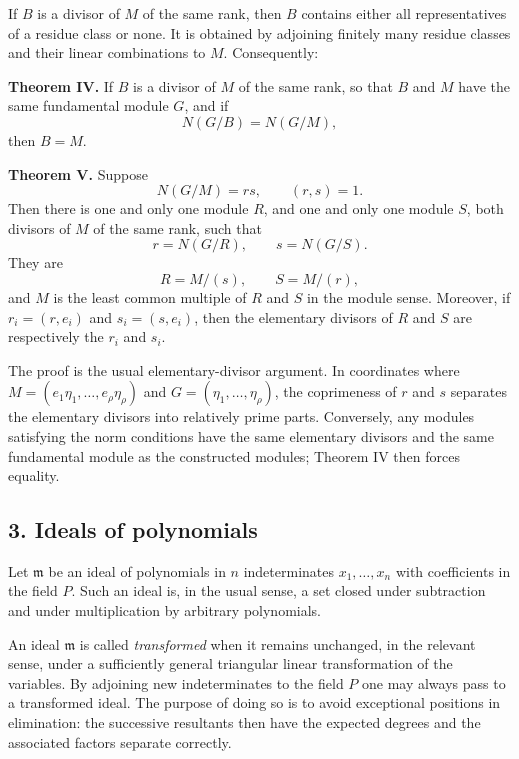 \documentclass[11pt]{article}
\begin{document}
If $B$ is a divisor of $M$ of the same rank, then $B$ contains either all representatives of a residue class or none. It is obtained by adjoining finitely many residue classes and their linear combinations to $M$. Consequently:

\textbf{Theorem IV.} If $B$ is a divisor of $M$ of the same rank, so that $B$ and $M$ have the same fundamental module $G$, and if
\[
  N(G/B)=N(G/M),
\]
then $B=M$.

\textbf{Theorem V.} Suppose
\begin{equation}
  N(G/M)=rs,\qquad (r,s)=1.                                      \tag{10}
\end{equation}
Then there is one and only one module $R$, and one and only one module $S$, both divisors of $M$ of the same rank, such that
\[
  r=N(G/R),\qquad s=N(G/S).
\]
They are
\begin{equation}
  R=M/(s),
  \qquad S=M/(r),                                                  \tag{11}
\end{equation}
and $M$ is the least common multiple of $R$ and $S$ in the module sense. Moreover, if $r_i=(r,e_i)$ and $s_i=(s,e_i)$, then the elementary divisors of $R$ and $S$ are respectively the $r_i$ and $s_i$.

The proof is the usual elementary-divisor argument. In coordinates where $M=(e_1\eta_1,\ldots,e_\rho\eta_\rho)$ and $G=(\eta_1,\ldots,\eta_\rho)$, the coprimeness of $r$ and $s$ separates the elementary divisors into relatively prime parts. Conversely, any modules satisfying the norm conditions have the same elementary divisors and the same fundamental module as the constructed modules; Theorem IV then forces equality.

\subsection{3. Ideals of polynomials}

Let $\mathfrak m$ be an ideal of polynomials in $n$ indeterminates $x_1,\ldots,x_n$ with coefficients in the field $P$. Such an ideal is, in the usual sense, a set closed under subtraction and under multiplication by arbitrary polynomials.

An ideal $\mathfrak m$ is called \emph{transformed} when it remains unchanged, in the relevant sense, under a sufficiently general triangular linear transformation of the variables. By adjoining new indeterminates to the field $P$ one may always pass to a transformed ideal. The purpose of doing so is to avoid exceptional positions in elimination: the successive resultants then have the expected degrees and the associated factors separate correctly.
\end{document}
